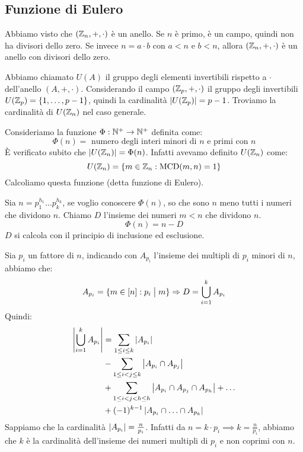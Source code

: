 \subsection{Funzione di Eulero}

Abbiamo visto che $(\mathbb{Z}_n, +, \cdot)$ \`e un anello. Se $n$ \`e primo, \`e un campo, quindi non ha divisori dello zero. Se invece $n = a \cdot b$ con $a < n$ e $b < n$, allora $(\mathbb{Z}_n, +, \cdot)$ \`e un anello con divisori dello zero.

Abbiamo chiamato $U(A)$ il gruppo degli elementi invertibili rispetto a $\cdot$ dell'anello $(A, +, \cdot)$. Considerando il campo $(\mathbb{Z}_p, +, \cdot)$ il gruppo degli invertibili $U(\mathbb{Z}_p) = \{1, \dots,  p-1\}$, quindi la cardinalit\`a $\left\lvert{U(\mathbb{Z}_p)}\right\rvert = p-1$. Troviamo la cardinalit\`a di $U(\mathbb{Z}_n)$ nel caso generale.

Consideriamo la funzione $\Phi : \mathbb{N}^+ \to \mathbb{N}^+$ definita come:
\[
\Phi (n) = \text{ numero degli interi minori di $n$ e primi con $n$}
\]
\`E verificato subito che $\left\lvert{U(\mathbb{Z}_n)}\right\rvert = \Phi(n)$. Infatti avevamo definito $U(\mathbb{Z}_n)$ come:
\[
U(\mathbb{Z}_n) = \{ m \in \mathbb{Z}_n : \operatorname{MCD}(m, n) = 1 \}
\]
Calcoliamo questa funzione (detta funzione di Eulero).

Sia $n = p_{1}^{h_1} \dots p_{k}^{h_k}$, se voglio conoscere $\Phi(n)$, so che sono $n$ meno tutti i numeri che dividono $n$. Chiamo $D$ l'insieme dei numeri $m < n$ che dividono $n$.
\[
\Phi(n) = n - D
\]
$D$ si calcola con il principio di inclusione ed esclusione. 

Sia $p_i$ un fattore di $n$, indicando con $A_{p_i} $ l'insieme dei multipli di $p_i$ minori di $n$, abbiamo che:
\[
A_{p_i} = \{ m \in [n] : p_i \bigm| m \} \Rightarrow
D = \bigcup_{i = 1}^{k} A_{p_i}
\]
Quindi:
\begin{align*}
\left\lvert{\bigcup_{i = 1}^{k} A_{p_i}}\right\rvert &= \sum_{1 \le i \le k} \left\lvert{A_{p_i}}\right\rvert \\
&- \sum_{1 \le i < j \le k} \left\lvert{A_{p_i} \cap A_{p_j}}\right\rvert \\
&+ \sum_{1 \le i < j < h \le h} \left\lvert{A_{p_i} \cap A_{p_j} \cap A_{p_h}}\right\rvert + \ldots  \\
&+ (-1)^{k-1} \left\lvert{A_{p_i} \cap \ldots \cap A_{p_k}}\right\rvert
\end{align*}
Sappiamo che la cardinalit\`a $\left\lvert{A_{p_i}}\right\rvert = \frac{n}{p_i}$. Infatti da $n = k \cdot p_i \implies k = \frac{n}{p_i}$, abbiamo che $k$ \`e la cardinalit\`a dell'insieme dei numeri multipli di $p_i$ e non coprimi con $n$.

